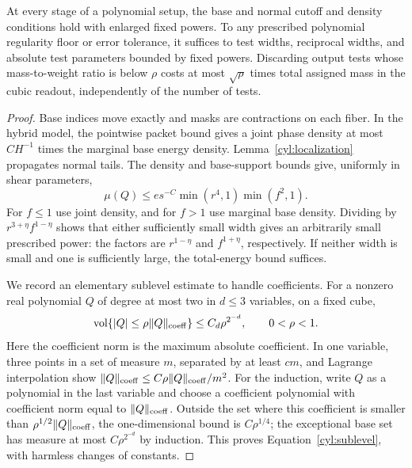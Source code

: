 \begin{lemma}\label{cyl:polynomial-tests}
At every stage of a polynomial setup, the base and normal cutoff and
density conditions hold with enlarged fixed powers.  To any prescribed
polynomial regularity floor or error tolerance, it suffices to test
widths, reciprocal widths, and absolute test parameters bounded by
fixed powers.  Discarding output tests whose mass-to-weight ratio is
below $\rho$ costs at most $\sqrt\rho$ times total assigned mass in
the cubic readout, independently of the number of tests.
\end{lemma}

\begin{proof}
Base indices move exactly and masks are contractions on each fiber.
In the hybrid model, the pointwise packet bound gives a joint phase
density at most $C H^{-1}$ times the marginal base energy density.
Lemma~\ref{cyl:localization} propagates normal tails.  The density and
base-support bounds give, uniformly in shear parameters,
\begin{equation}\label{cyl:volume-bound}
 \mu(Q)\le e s^{-C}\min(r^4,1)\min(f^2,1).
\end{equation}
For $f\le1$ use joint density, and for $f>1$ use marginal base density.
Dividing by $r^{3+\eta}f^{1-\eta}$ shows that either sufficiently small
width gives an arbitrarily small prescribed power: the factors are
$r^{1-\eta}$ and $f^{1+\eta}$, respectively.  If neither width is small
and one is sufficiently large, the total-energy bound suffices.

We record an elementary sublevel estimate to handle coefficients.  For a
nonzero real polynomial $Q$ of degree at most two in $d\le3$ variables, on a
fixed cube,
\begin{equation}\label{cyl:sublevel}
 \operatorname{vol}\{\lvert Q\rvert\le\rho\lVert Q\rVert_{\mathrm{coeff}}\}
       \le C_d\rho^{2^{-d}},\qquad 0<\rho<1.
\end{equation}
Here the coefficient norm is the maximum absolute coefficient.  In one
variable, three points in a set of measure $m$, separated by at least
$cm$, and Lagrange interpolation show
$\lVert Q\rVert_{\mathrm{coeff}}\le C\rho\lVert Q\rVert_{\mathrm{coeff}}/m^2$.
For the induction, write $Q$ as a polynomial in the last variable and
choose a coefficient polynomial with coefficient norm equal to
$\lVert Q\rVert_{\mathrm{coeff}}$.  Outside the set where this coefficient is
smaller than $\rho^{1/2}\lVert Q\rVert_{\mathrm{coeff}}$, the one-dimensional
bound is $C\rho^{1/4}$; the exceptional base set has measure at most
$C\rho^{2^{-d}}$ by induction.  This proves
Equation~\eqref{cyl:sublevel}, with harmless changes of constants.


\end{proof}
